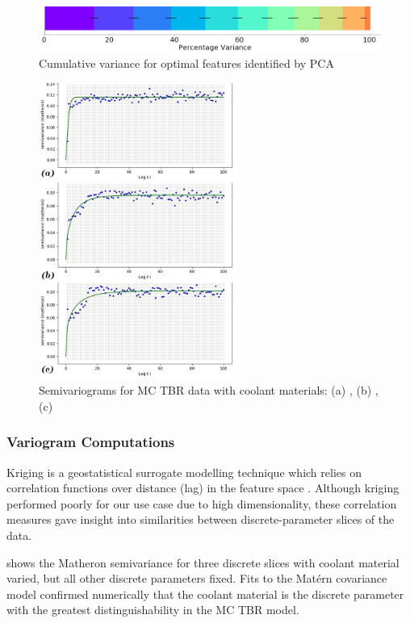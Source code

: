 \begin{figure}[h]
	\centering
	\includegraphics[width=0.6\linewidth]{fig2_pca.jpg}
	\caption{Cumulative variance for optimal features identified by PCA}
	\label{fig:pca}
\end{figure}

\begin{figure}
	\centering
	\hspace*{-.3\columnsep}\includegraphics[width=0.58\textwidth]{fig3_allvar.jpg}
	\caption{Semivariograms for MC TBR data with coolant materials: (a) ,
	(b) , (c) }
	\label{fig:var}
\end{figure}

\subsubsection{Variogram Computations}

Kriging is a geostatistical surrogate modelling technique which relies on
correlation functions over distance (lag) in the feature space \cite{Bouhlel2018}. Although kriging performed poorly for our use case due to high dimensionality, these correlation measures gave insight into similarities between discrete-parameter slices of the data.

 shows the Matheron semivariance \cite{Matheron1963} for three discrete slices with coolant material varied, but all other discrete parameters fixed. Fits \cite{KrigingFig} to the Matérn covariance model confirmed numerically that the coolant material is the discrete parameter with the greatest distinguishability in the MC TBR model. 


